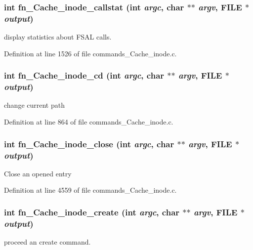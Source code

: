 \subsubsection[{fn\_\-Cache\_\-inode\_\-callstat}]{\setlength{\rightskip}{0pt plus 5cm}int fn\_\-Cache\_\-inode\_\-callstat (int {\em argc}, \/  char $\ast$$\ast$ {\em argv}, \/  FILE $\ast$ {\em output})}\label{commands__Cache__inode_8c_a711e4a11e5bf3bb7fd4be1cdb5f33010}
display statistics about FSAL calls. 

Definition at line 1526 of file commands\_\-Cache\_\-inode.c.
\subsubsection[{fn\_\-Cache\_\-inode\_\-cd}]{\setlength{\rightskip}{0pt plus 5cm}int fn\_\-Cache\_\-inode\_\-cd (int {\em argc}, \/  char $\ast$$\ast$ {\em argv}, \/  FILE $\ast$ {\em output})}\label{commands__Cache__inode_8c_ade5ad3cf431b9c4586c59b909c87c6b9}
change current path 

Definition at line 864 of file commands\_\-Cache\_\-inode.c.
\subsubsection[{fn\_\-Cache\_\-inode\_\-close}]{\setlength{\rightskip}{0pt plus 5cm}int fn\_\-Cache\_\-inode\_\-close (int {\em argc}, \/  char $\ast$$\ast$ {\em argv}, \/  FILE $\ast$ {\em output})}\label{commands__Cache__inode_8c_af0ca1153461f207ba7c227ef1563feef}
Close an opened entry 

Definition at line 4559 of file commands\_\-Cache\_\-inode.c.
\subsubsection[{fn\_\-Cache\_\-inode\_\-create}]{\setlength{\rightskip}{0pt plus 5cm}int fn\_\-Cache\_\-inode\_\-create (int {\em argc}, \/  char $\ast$$\ast$ {\em argv}, \/  FILE $\ast$ {\em output})}\label{commands__Cache__inode_8c_a6c91f15dff648eb0932a0bd012182818}
proceed an create command. 

